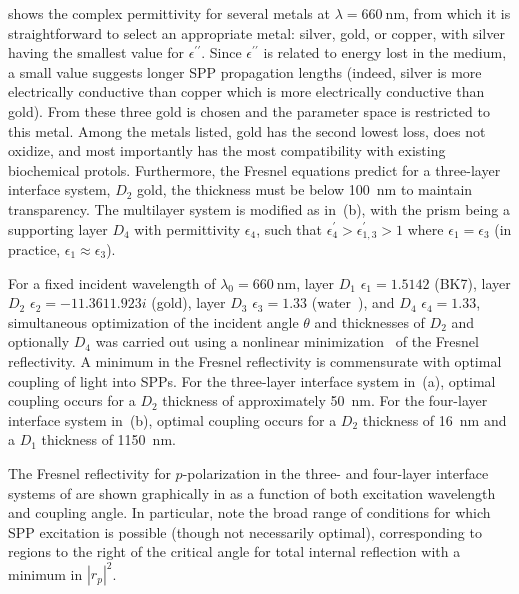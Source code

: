  shows the complex permittivity for several metals
at $\lambda=\SI{660}{\nano\meter}$, from which it is straightforward to
select an appropriate metal: silver, gold, or copper, with silver having
the smallest value for $\epsilon^{\prime\prime}$.  Since
$\epsilon^{\prime\prime}$ is related to energy lost in the medium, a small
value suggests longer SPP propagation lengths (indeed, silver is more
electrically conductive than copper which is more electrically conductive
than gold).  From these three gold is chosen and the parameter space is
restricted to this metal.  Among the metals listed, gold has the second
lowest loss, does not oxidize, and most importantly has the most
compatibility with existing biochemical protols.  Furthermore, the Fresnel
equations predict for a three-layer interface system, $D_2$ gold, the
thickness must be below \SI{100}{\nano\meter} to maintain transparency.
The multilayer system is modified as in \,(b),
with the prism being a supporting layer $D_4$ with permittivity
$\epsilon_4$, such that $\epsilon^\prime_4>\epsilon^\prime_{1,3}>1$ where
$\epsilon_1=\epsilon_3$ (in practice, $\epsilon_1\approx\epsilon_3$).

For a fixed incident wavelength of $\lambda_0=\SI{660}{\nano\meter}$, layer
$D_1$ $\epsilon_1=1.5142$ (BK7), layer $D_2$
$\epsilon_2=\num{-11.361+1.923i}$ (gold), layer $D_3$ $\epsilon_3=1.33$
(water~\cite{andreasson1971measurement}), and $D_4$ $\epsilon_4=1.33$,
simultaneous optimization of the incident angle $\theta$ and thicknesses of
$D_2$ and optionally $D_4$ was carried out using a nonlinear
minimization~\cite{brent1973algorithms} of the Fresnel reflectivity.  A
minimum in the Fresnel reflectivity is commensurate with optimal coupling
of light into SPPs.  For the three-layer interface system in
\,(a), optimal coupling occurs for a $D_2$
thickness of approximately \SI{50}{\nano\meter}.  For the four-layer
interface system in \,(b), optimal coupling
occurs for a $D_2$ thickness of \SI{16}{\nano\meter} and a $D_1$ thickness
of \SI{1150}{\nano\meter}.

The Fresnel reflectivity for $p$-polarization in the three- and four-layer
interface systems of  are shown graphically
in  as a function of both excitation wavelength
and coupling angle.  In particular, note the broad range of conditions for
which SPP excitation is possible (though not necessarily optimal),
corresponding to regions to the right of the critical angle for total
internal reflection with a minimum in $|r_p|^2$.


